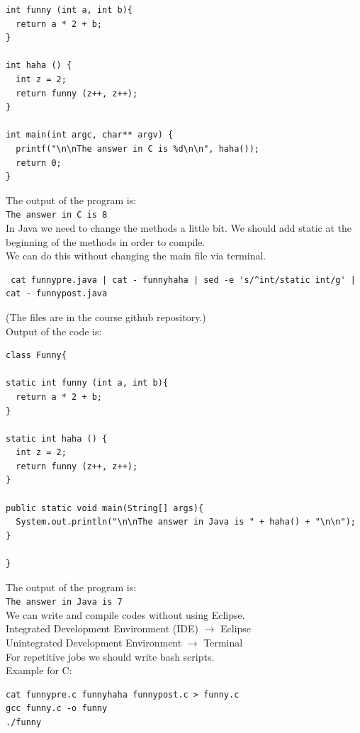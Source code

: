 \documentclass{article}
\begin{document}
\begin{flushleft}
\begin{flushleft}
\begin{verbatim}
int funny (int a, int b){
  return a * 2 + b;
}

int haha () {
  int z = 2;
  return funny (z++, z++);
}

int main(int argc, char** argv) {
  printf("\n\nThe answer in C is %d\n\n", haha());
  return 0;
}
\end{verbatim}
The output of the program is:\\
\verb|The answer in C is 8|\\
\bigskip
In Java we need to change the methods a little bit. We should add static at the beginning of the methods in order to compile.\\
We can do this without changing the main file via terminal.\\
\begin{verbatim}
 cat funnypre.java | cat - funnyhaha | sed -e 's/^int/static int/g' | cat - funnypost.java
\end{verbatim}
(The files are in the course github repository.)\\
\pagebreak
Output of the code is:
\begin{verbatim}
class Funny{

static int funny (int a, int b){
  return a * 2 + b;
}

static int haha () {
  int z = 2;
  return funny (z++, z++);
} 

public static void main(String[] args){
  System.out.println("\n\nThe answer in Java is " + haha() + "\n\n");
}

}
\end{verbatim}
The output of the program is:\\
\verb|The answer in Java is 7|\\
\bigskip
We can write and compile codes without using Eclipse.\\
Integrated Development Environment (IDE) $ \rightarrow $ Eclipse\\
Unintegrated Development Environment $ \rightarrow $ Terminal\\
\bigskip
For repetitive jobs we should write bash scripts.\\
Example for C:
\begin{verbatim}
cat funnypre.c funnyhaha funnypost.c > funny.c
gcc funny.c -o funny
./funny
\end{verbatim}


\end{flushleft}
\end{flushleft}
\end{document}
